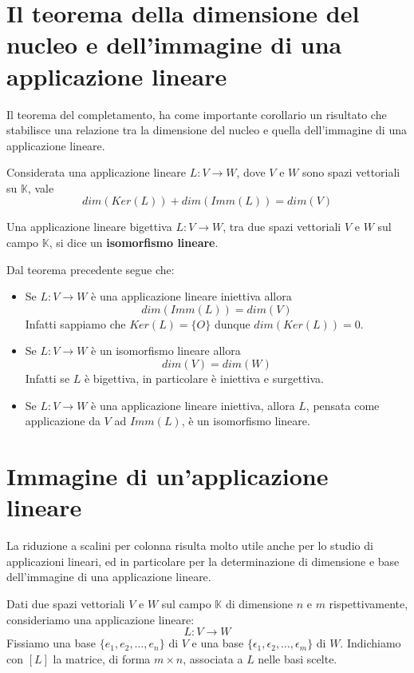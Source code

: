 \section{Il teorema della dimensione del nucleo e dell'immagine di una applicazione lineare}
Il teorema del completamento, ha come importante corollario un risultato che stabilisce
una relazione tra la dimensione del nucleo e quella dell'immagine di una applicazione
lineare.

\begin{theorem}
	Considerata una applicazione lineare $L : V \to W$, dove $V$ e $W$ sono spazi
	vettoriali su $\mathbb{K}$, vale
	\begin{equation*}
		dim(Ker(L)) + dim(Imm(L)) = dim(V)
	\end{equation*}
\end{theorem}

\begin{definition}
	Una applicazione lineare bigettiva $L : V \to W$, tra due spazi vettoriali $V$ e $W$
	sul campo $\mathbb{K}$, si dice un \textbf{isomorfismo lineare}.

	Dal teorema precedente segue che:
	\begin{itemize}
		\item Se $L : V \to W$ \`e una applicazione lineare iniettiva allora
		      \[ dim(Imm(L)) = dim(V) \]
		      Infatti sappiamo che $Ker(L) = \{O\}$ dunque $dim(Ker(L)) = 0$.
		\item Se $L : V \to W$ \`e un isomorfismo lineare allora \[dim(V) = dim(W)\]
		      Infatti se $L$ \`e bigettiva, in particolare \`e iniettiva e surgettiva.
		\item Se $L : V \to W$ \`e una applicazione lineare iniettiva, allora $L$,
		      pensata come applicazione da $V$ ad $Imm(L)$, \`e un isomorfismo lineare.
	\end{itemize}
\end{definition}

\section{Immagine di un'applicazione lineare}
La riduzione a scalini per colonna risulta molto utile anche per lo
studio di applicazioni lineari, ed in particolare per la
determinazione di dimensione e base dell'immagine di una applicazione
lineare.

Dati due spazi vettoriali $V$ e $W$ sul campo $\mathbb{K}$ di dimensione $n$
e $m$ rispettivamente, consideriamo una applicazione lineare:
\begin{equation*}
	L : V \to W
\end{equation*}
Fissiamo una base $\{e_1, e_2, \dots, e_n\}$ di $V$ e una base
$\{\epsilon_1, \epsilon_2, \dots, \epsilon_m\}$ di $W$. Indichiamo con $[L]$
la matrice, di forma $m \times n$, associata a $L$ nelle basi scelte.

